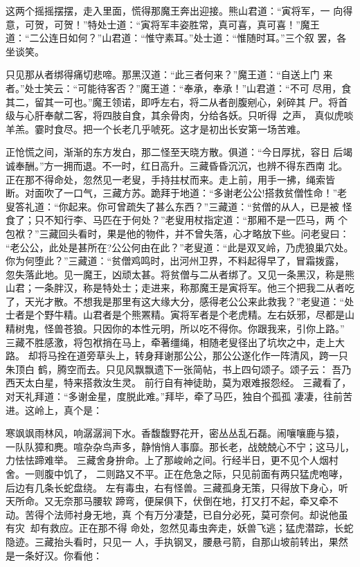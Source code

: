 这两个摇摇摆摆，走入里面，慌得那魔王奔出迎接。熊山君道：“寅将军，一
向得意，可贺，可贺！”特处士道：“寅将军丰姿胜常，真可喜，真可喜！”魔王
道：“二公连日如何？”山君道：“惟守素耳。”处士道：“惟随时耳。”三个叙
罢，各坐谈笑。

只见那从者绑得痛切悲啼。那黑汉道：“此三者何来？”魔王道：“自送上门
来者。”处士笑云：“可能待客否？”魔王道：“奉承，奉承！”山君道：“不可
尽用，食其二，留其一可也。”魔王领诺，即呼左右，将二从者剖腹剜心，剁碎其
尸。将首级与心肝奉献二客，将四肢自食，其余骨肉，分给各妖。只听得之声，
真似虎啖羊羔。霎时食尽。把一个长老几乎唬死。这才是初出长安第一场苦难。

正怆慌之间，渐渐的东方发白，那二怪至天晓方散。俱道：“今日厚扰，容日
后竭诚奉酬。”方一拥而退。不一时，红日高升。三藏昏昏沉沉，也辨不得东西南
北。正在那不得命处，忽然见一老叟，手持拄杖而来。走上前，用手一拂，绳索皆
断。对面吹了一口气，三藏方苏。跪拜于地道：“多谢老公公!搭救贫僧性命！”老
叟答礼道：“你起来。你可曾疏失了甚么东西？”三藏道：“贫僧的从人，已是被
怪食了；只不知行李、马匹在于何处？”老叟用杖指定道：“那厢不是一匹马，两
个包袱？”三藏回头看时，果是他的物件，并不曾失落，心才略放下些。问老叟曰：
“老公公，此处是甚所在?公公何由在此？”老叟道：“此是双叉岭，乃虎狼巢穴处。
你为何堕此？”三藏道：“贫僧鸡鸣时，出河州卫界，不料起得早了，冒霜拨露，
忽失落此地。见一魔王，凶顽太甚。将贫僧与二从者绑了。又见一条黑汉，称是熊
山君；一条胖汉，称是特处士；走进来，称那魔王是寅将军。他三个把我二从者吃
了，天光才散。不想我是那里有这大缘大分，感得老公公来此救我？”老叟道：“处
士者是个野牛精。山君者是个熊罴精。寅将军者是个老虎精。左右妖邪，尽都是山
精树鬼，怪兽苍狼。只因你的本性元明，所以吃不得你。你跟我来，引你上路。”
三藏不胜感激，将包袱捎在马上，牵著缰绳，相随老叟径出了坑坎之中，走上大路。
却将马拴在道旁草头上，转身拜谢那公公，那公公遂化作一阵清风，跨一只朱顶白
鹤，腾空而去。只见风飘飘遗下一张简帖，书上四句颂子。颂子云：
吾乃西天太白星，特来搭救汝生灵。
前行自有神徒助，莫为艰难报怨经。
三藏看了，对天礼拜道：“多谢金星，度脱此难。”拜毕，牵了马匹，独自个孤孤
凄凄，往前苦进。这岭上，真个是：

寒飒飒雨林风，响潺潺涧下水。香馥馥野花开，密丛丛乱石磊。闹嚷嚷鹿与猿，
一队队獐和麂。喧杂杂鸟声多，静悄悄人事靡。那长老，战兢兢心不宁；这马儿，
力怯怯蹄难举。
三藏舍身拚命。上了那峻岭之间。行经半日，更不见个人烟村舍。一则腹中饥了，
二则路又不平。正在危急之际，只见前面有两只猛虎咆哮，后边有几条长蛇盘绕。
左有毒虫，右有怪兽。三藏孤身无策，只得放下身心，听天所命。又无奈那马腰软
蹄弯，便屎俱下，伏倒在地，打又打不起，牵又牵不动。苦得个法师衬身无地，真
个有万分凄楚，已自分必死，莫可奈何。却说他虽有灾，却有救应。正在那不得
命处，忽然见毒虫奔走，妖兽飞逃；猛虎潜踪，长蛇隐迹。三藏抬头看时，只见一
人，手执钢叉，腰悬弓箭，自那山坡前转出，果然是一条好汉。你看他：

